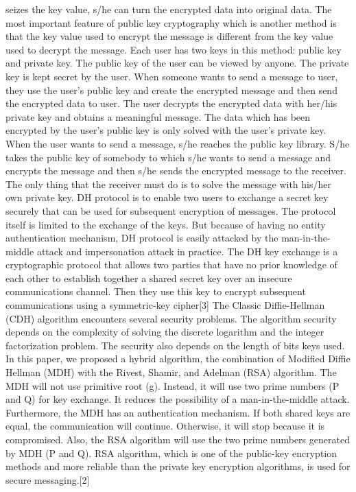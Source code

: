 seizes the  key value,  s/he can turn  the  encrypted data into  original data.  The most  important
feature of public key cryptography which is another method is that the key value used to encrypt
the message is different from the key value used to decrypt the message. Each user has two keys
in this method: public key and private key. The public key of the user can be viewed by anyone.
The private key is kept secret by the user. When someone wants to send a message to user, they
use the user's public key and create the encrypted message and then send the encrypted data to
user. The user  decrypts the  encrypted data with  her/his private  key  and obtains  a meaningful
message.
The data which has been encrypted by the user’s public key is only solved with the user’s private key. When the user wants to send a message, s/he reaches the public key library. S/he takes the public key of somebody to which s/he wants to send a message and encrypts the message and then s/he sends the encrypted message to the receiver. The only thing that the receiver must do is to solve the message with his/her own private key. DH protocol is to enable two users to exchange a secret key securely that can be used for subsequent encryption of messages. The protocol itself is limited to the exchange of the keys. But because of having no entity authentication mechanism, DH protocol is easily attacked by the man-in-the-middle attack and impersonation attack in practice. The DH key exchange is a cryptographic protocol that allows two parties that have no prior knowledge of each other to establish together a shared secret key over an insecure communications channel. Then they use this key to encrypt subsequent communications using a symmetric-key cipher[3]
The Classic Diffie-Hellman (CDH) algorithm encounters several security problems. The algorithm security depends on the complexity of solving the discrete logarithm and the integer factorization problem. The security also depends on the length of bits keys used. In this paper, we proposed a hybrid algorithm, the combination of Modified Diffie Hellman (MDH) with the Rivest, Shamir, and Adelman (RSA) algorithm. The MDH will not use primitive root (g). Instead, it will use two prime numbers (P and Q) for key exchange. It reduces the possibility of a man-in-the-middle attack. Furthermore, the MDH has an authentication mechanism. If both shared keys are equal, the communication will continue. Otherwise, it will stop because it is compromised. Also, the RSA algorithm will use the two prime numbers generated by MDH (P and Q). RSA algorithm, which is one of the public-key encryption methods and more reliable than the private key encryption algorithms, is used for secure messaging.[2]
